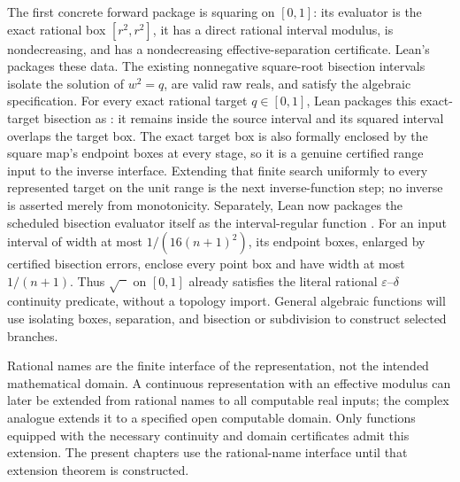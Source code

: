\begin{example}
\label{ex:algebraic-inverse-branches}
The first concrete forward package is squaring on \([0,1]\): its evaluator is
the exact rational box \([r^2,r^2]\), it has a direct rational interval
modulus, is nondecreasing, and has a nondecreasing effective-separation
certificate.  Lean's  packages these data.
The existing nonnegative square-root bisection intervals
isolate the solution of \(w^2=q\), are valid raw reals, and satisfy the
algebraic specification.  For every exact rational target \(q\in[0,1]\),
Lean packages this exact-target bisection as
: it remains inside the source interval and
its squared interval overlaps the target box.  The exact target box is also
formally enclosed by the square map's endpoint boxes at every stage, so it is
a genuine certified range input to the inverse interface.  Extending that
finite search uniformly to every represented target on the unit range is the
next inverse-function step; no inverse is asserted merely from monotonicity.
Separately, Lean now packages the scheduled bisection evaluator itself as the
interval-regular function .  For an input interval of width
at most \(1/(16(n+1)^2)\), its endpoint boxes, enlarged by certified bisection
errors, enclose every point box and have width at most \(1/(n+1)\).  Thus
\(\sqrt{\phantom{x}}\) on \([0,1]\) already satisfies the literal rational
\(\varepsilon\)--\(\delta\) continuity predicate, without a topology import.
General algebraic functions will use isolating boxes, separation, and
bisection or subdivision to construct selected branches.
\end{example}

\begin{remark}
\label{rem:continuous-extension-of-function-representations}
Rational names are the finite interface of the representation, not the
intended mathematical domain.  A continuous representation with an effective
modulus can later be extended from rational names to all computable real
inputs; the complex analogue extends it to a specified open computable domain.
Only functions equipped with the necessary continuity and domain certificates
admit this extension.  The present chapters use the rational-name interface
until that extension theorem is constructed.
\end{remark}


